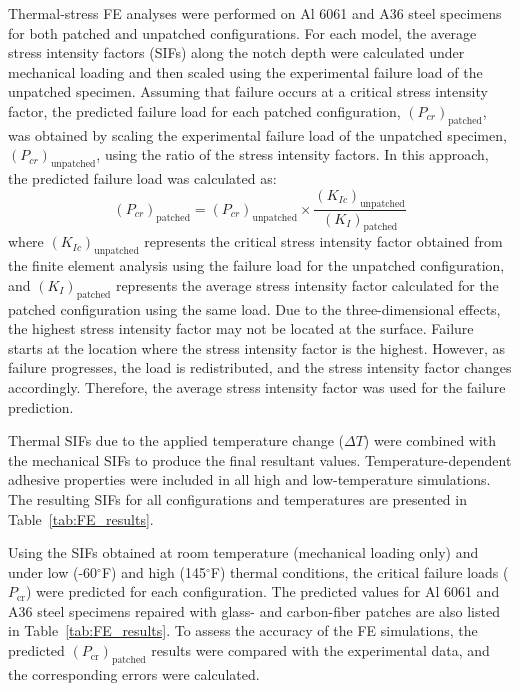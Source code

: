 \documentclass[journal,article,submit,pdftex,moreauthors]{Definitions/mdpi}
\begin{document}
Thermal-stress FE analyses were performed on Al 6061 and A36 steel specimens for both patched and unpatched configurations. For each model, the average stress intensity factors (SIFs) along the notch depth were calculated under mechanical loading and then scaled using the experimental failure load of the unpatched specimen. Assuming that failure occurs at a critical stress intensity factor, the predicted failure load for each patched configuration, $(P_{cr})_{\text{patched}}$, was obtained by scaling the experimental failure load of the unpatched specimen, $(P_{cr})_{\text{unpatched}}$, using the ratio of the stress intensity factors. In this approach, the predicted failure load was calculated as:
\[
(P_{cr})_{\text{patched}} = (P_{cr})_{\text{unpatched}} \times \frac{(K_{Ic})_{\text{unpatched}}}{(K_{I})_{\text{patched}}}
\]
where $(K_{Ic})_{\text{unpatched}}$ represents the critical stress intensity factor obtained from the finite element analysis using the failure load for the unpatched configuration, and $(K_{I})_{\text{patched}}$ represents the average stress intensity factor calculated for the patched configuration using the same load. Due to the three-dimensional effects, the highest stress intensity factor may not be located at the surface. Failure starts at the location where the stress intensity factor is the highest. However, as failure progresses, the load is redistributed, and the stress intensity factor changes accordingly. Therefore, the average stress intensity factor was used for the failure prediction.

Thermal SIFs due to the applied temperature change ($\Delta T$) were combined with the mechanical SIFs to produce the final resultant values. Temperature-dependent adhesive properties were included in all high and low-temperature simulations. The resulting SIFs for all configurations and temperatures are presented in Table~\ref{tab:FE_results}. 


Using the SIFs obtained at room temperature (mechanical loading only) and under low (-60$^\circ$F) and high (145$^\circ$F) thermal conditions, the critical failure loads ($P_{\mathrm{cr}}$) were predicted for each configuration. The predicted values for Al 6061 and A36 steel specimens repaired with glass- and carbon-fiber patches are also listed in Table~\ref{tab:FE_results}. To assess the accuracy of the FE simulations, the predicted $(P_{\mathrm{cr}})_{\text{patched}}$ results were compared with the experimental data, and the corresponding errors were calculated.
\end{document}
